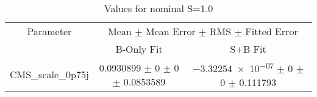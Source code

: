 \begin{table}
\centering
\caption{Values for nominal S=1.0}
\begin{tabular}{ccc}
\toprule
Parameter 	& \multicolumn{2}{c}{Mean $\pm$ Mean Error $\pm$ RMS $\pm$ Fitted Error}\\
 	& B-Only Fit & S+B Fit\\
\midrule
CMS\_scale\_0p75j 	& \num{0.0930899} $\pm$ \num{0} $\pm$ \num{0} $\pm$ \num{0.0853589} 	& \num{-3.32254e-07} $\pm$ \num{0} $\pm$ \num{0} $\pm$ \num{0.111793}\\
\bottomrule
\end{tabular}
\end{table}